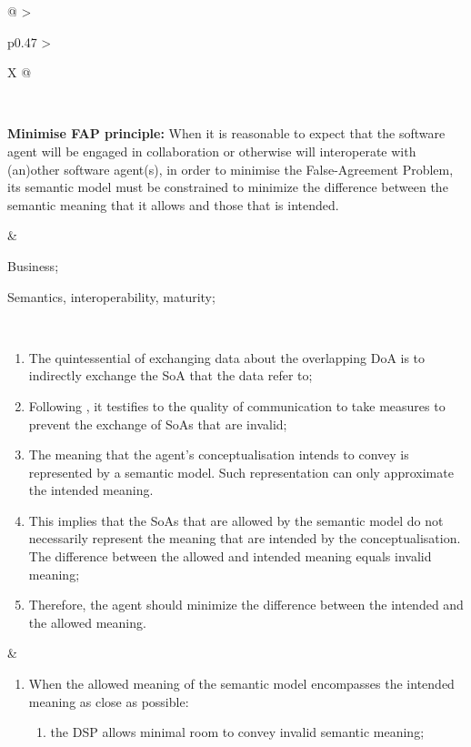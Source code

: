 \begin{xltabular}[l]{\linewidth}{@{} >{\small\raggedright\arraybackslash}p{0.47\linewidth} >{\small\raggedright\arraybackslash}X @{}}
\begin{enumerate}[left=10pt, nosep]
\end{enumerate} \\
%
%
%
\begin{mmdp}\label{dp:mfapp}{\bfseries Minimise FAP principle:}
\quad When it is reasonable to expect that the software agent will be engaged in collaboration or otherwise will interoperate with (an)other software agent(s), in order to minimise the False-Agreement Problem, its semantic model must be constrained to minimize the difference between the semantic meaning that it allows and those that is intended.
\end{mmdp}
&
\begin{description}[labelwidth=3.7cm,leftmargin=3.7cm+1ex,nosep,topsep=2ex,labelsep=1ex,font=\bfseries]
  \item[Type of information:] Business;
  \item[Quality attributes:] Semantics, interoperability, maturity;
\end{description} \\
\begin{enumerate}[left=6pt, nosep]
  \item The quintessential of exchanging data about the overlapping DoA is to indirectly exchange the SoA that the data refer to;
  \item Following \cite{Grice:1991BT}, it testifies to the quality of communication to take measures to prevent the exchange of SoAs that are invalid;
  \item The meaning that the agent's conceptualisation intends to convey is represented by a semantic model. Such representation can only approximate the intended meaning. 
  \item This implies that the SoAs that are allowed by the semantic model do not necessarily represent the meaning that are intended by the conceptualisation. The difference between the allowed and intended meaning equals invalid meaning;
  \item Therefore, the agent should minimize the difference between the intended and the allowed meaning.
\end{enumerate}
&
\begin{enumerate}[left=10pt, nosep]
  \item When the allowed meaning of the semantic model encompasses the intended meaning as close as possible:
  \begin{enumerate}
    \item the DSP allows minimal room to convey invalid semantic meaning;

\end{enumerate}
\end{enumerate}
\end{xltabular}
